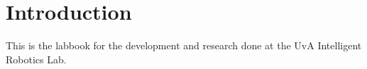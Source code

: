 \chapter{Introduction}

This is the labbook for the development and research done at the UvA Intelligent Robotics Lab.
